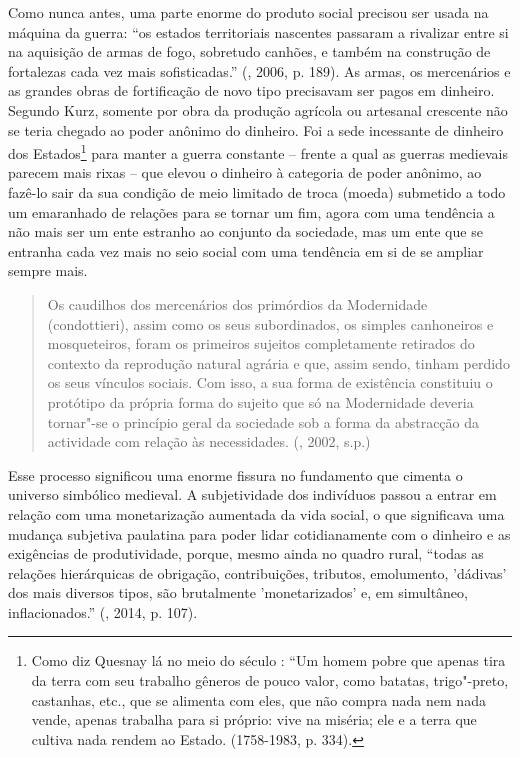 Como nunca antes, uma parte enorme do produto social precisou ser usada
na máquina da guerra: ``os estados territoriais nascentes passaram a
rivalizar entre si na aquisição de armas de fogo, sobretudo canhões, e
também na construção de fortalezas cada vez mais sofisticadas.'' (,
2006, p. 189). As armas, os mercenários e as grandes obras de
fortificação de novo tipo precisavam ser pagos em dinheiro. Segundo
Kurz, somente por obra da produção agrícola ou artesanal crescente não
se teria chegado ao poder anônimo do dinheiro. Foi a sede incessante de
dinheiro dos Estados\footnote{Como diz Quesnay lá no meio do século
  : ``Um homem pobre que apenas tira da terra com seu trabalho
  gêneros de pouco valor, como batatas, trigo"-preto, castanhas, etc.,
  que se alimenta com eles, que não compra nada nem nada vende, apenas
  trabalha para si próprio: vive na miséria; ele e a terra que cultiva
  nada rendem ao Estado. (1758-1983, p. 334).} para manter a guerra
constante -- frente a qual as guerras medievais parecem mais rixas --
que elevou o dinheiro à categoria de poder anônimo, ao fazê-lo sair da
sua condição de meio limitado de troca (moeda) submetido a todo um
emaranhado de relações para se tornar um fim, agora com uma tendência a
não mais ser um ente estranho ao conjunto da sociedade, mas um ente que
se entranha cada vez mais no seio social com uma tendência em si de se
ampliar sempre mais.

\begin{quote}
Os caudilhos dos mercenários dos primórdios da Modernidade
(condottieri), assim como os seus subordinados, os simples canhoneiros e
mosqueteiros, foram os primeiros sujeitos completamente retirados do
contexto da reprodução natural agrária e que, assim sendo, tinham
perdido os seus vínculos sociais. Com isso, a sua forma de existência
constituiu o protótipo da própria forma do sujeito que só na Modernidade
deveria tornar"-se o princípio geral da sociedade sob a forma da
abstracção da actividade com relação às necessidades. (, 2002, s.p.)
\end{quote}

Esse processo significou uma enorme fissura no fundamento que cimenta o
universo simbólico medieval. A subjetividade dos indivíduos passou a
entrar em relação com uma monetarização aumentada da vida social, o que
significava uma mudança subjetiva paulatina para poder lidar
cotidianamente com o dinheiro e as exigências de produtividade, porque,
mesmo ainda no quadro rural, ``todas as relações hierárquicas de
obrigação, contribuições, tributos, emolumento, 'dádivas' dos mais
diversos tipos, são brutalmente 'monetarizados' e, em simultâneo,
inflacionados.'' (, 2014, p. 107).

